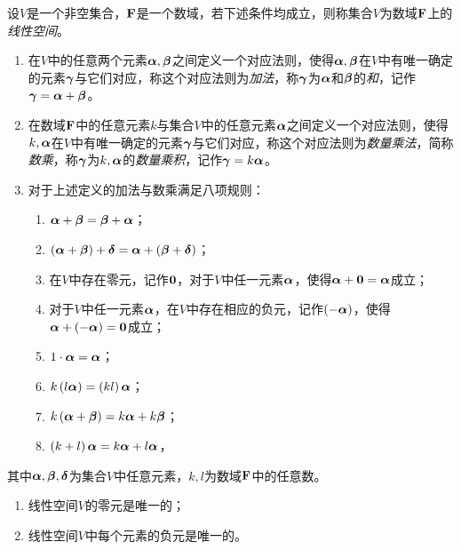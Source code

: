 \documentclass{ctexart}
\begin{document}
\begin{definition}[线性空间]
    设\(V\)是一个非空集合，\(\boldsymbol{\mathrm{F}}\)是一个数域，若下述条件均成立，则称集合\(V\)为数域\(\boldsymbol{\mathrm{F}}\)上的\emph{线性空间}。
    \begin{enumerate}
        \item 在\(V\)中的任意两个元素\(\boldsymbol{\alpha},\boldsymbol{\beta}\)之间定义一个对应法则，使得\(\boldsymbol{\alpha},\boldsymbol{\beta}\)在\(V\)中有唯一确定的元素\(\boldsymbol{\gamma}\)与它们对应，称这个对应法则为\emph{加法}，称\(\boldsymbol{\gamma}\)为\(\boldsymbol{\alpha}\)和\(\boldsymbol{\beta}\)的\emph{和}，记作\(\boldsymbol{\gamma}=\boldsymbol{\alpha}+\boldsymbol{\beta}\)。
        \item 在数域\(\boldsymbol{\mathrm{F}}\)中的任意元素\(k\)与集合\(V\)中的任意元素\(\boldsymbol{\alpha}\)之间定义一个对应法则，使得\(k,\boldsymbol{\alpha}\)在\(V\)中有唯一确定的元素\(\boldsymbol{\gamma}\)与它们对应，称这个对应法则为\emph{数量乘法}，简称\emph{数乘}，称\(\boldsymbol{\gamma}\)为\(k,\boldsymbol{\alpha}\)的\emph{数量乘积}，记作\(\boldsymbol{\gamma}=k\boldsymbol{\alpha}\)。
        \item 对于上述定义的加法与数乘满足八项规则：\begin{enumerate}
                  \item \(\boldsymbol{\alpha}+\boldsymbol{\beta}=\boldsymbol{\beta}+\boldsymbol{\alpha}\)；
                  \item \(\left( \boldsymbol{\alpha}+\boldsymbol{\beta} \right)+\boldsymbol{\delta}=\boldsymbol{\alpha}+\left( \boldsymbol{\beta}+\boldsymbol{\delta} \right)\)；
                  \item 在\(V\)中存在零元，记作\(\boldsymbol{0}\)，对于\(V\)中任一元素\(\boldsymbol{\alpha}\)，使得\(\boldsymbol{\alpha}+\boldsymbol{0}=\boldsymbol{\alpha}\)成立；
                  \item 对于\(V\)中任一元素\(\boldsymbol{\alpha}\)，在\(V\)中存在相应的负元，记作\(\left( -\boldsymbol{\alpha} \right)\)，使得\(\boldsymbol{\alpha}+\left( -\boldsymbol{\alpha} \right)=\boldsymbol{0}\)成立；
                  \item \(1\cdot\boldsymbol{\alpha}=\boldsymbol{\alpha}\)；
                  \item \(k\left( l\boldsymbol{\alpha} \right)=\left( kl \right)\boldsymbol{\alpha}\)；
                  \item \(k\left( \boldsymbol{\alpha}+\boldsymbol{\beta} \right)=k\boldsymbol{\alpha}+k\boldsymbol{\beta}\)；
                  \item \(\left( k+l \right)\boldsymbol{\alpha}=k\boldsymbol{\alpha}+l\boldsymbol{\alpha}\)，
              \end{enumerate}
    \end{enumerate}
    其中\(\boldsymbol{\alpha},\boldsymbol{\beta},\boldsymbol{\delta}\)为集合\(V\)中任意元素，\(k,l\)为数域\(\boldsymbol{\mathrm{F}}\)中的任意数。
\end{definition}

\begin{property}
    \begin{enumerate}
        \item 线性空间\(V\)的零元是唯一的；
        \item 线性空间\(V\)中每个元素的负元是唯一的。
    \end{enumerate}
\end{property}
\end{document}
